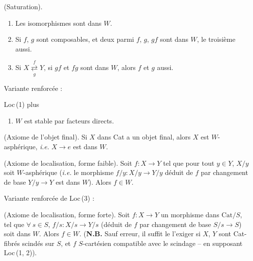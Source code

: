 \begin{description}[style=sameline,leftmargin=6.5em]
\item[Loc\,(1)] (Saturation).
\begin{enumerate}[leftmargin=2.5em]
\item[$a$)] Les isomorphismes sont dans $W$.
\item[$b$)] Si $f$, $g$ sont composables, et deux parmi $f$, $g$, $gf$ sont dans $W$, le troisième aussi.
\item[$c$)] Si $X \underset{g}{\overset{f}{\rightleftarrows}} Y$, si $gf$ et $fg$ sont dans $W$, alors $f$ et $g$ aussi.
\end{enumerate}
\end{description}
\noindent Variante renforcée :
\begin{description}[style=sameline,leftmargin=6.5em]
\item[Loc\,(1\,bis)] Loc\,(1) plus
\begin{enumerate}[leftmargin=2.5em]
\item[$d$)] $W$ est stable par facteurs directs.
\end{enumerate}
\item[Loc\,(2)] (Axiome de l'objet final). Si $X$ dans Cat a un objet final, alors $X$ est $W$-asphérique, \textit{i.e.} $X \longrightarrow e$ est dans $W$.
\item[Loc\,(3)] (Axiome de localisation, forme faible). Soit $f : X \longrightarrow Y$ tel que pour tout $y \in Y$, $X/y$ soit $W$-asphérique (\textit{i.e.} le morphisme $f/y : X/y \longrightarrow Y/y$ déduit de $f$ par changement de base $Y/y \longrightarrow Y$ est dans $W$). Alors $f \in W$.
\end{description}
\noindent Variante renforcée de Loc\,(3) :
\begin{description}[style=sameline,leftmargin=6.5em]
\item[Loc\,(3\,bis)] (Axiome de localisation, forme forte). Soit $f : X \longrightarrow Y$ un morphisme dans $\mathrm{Cat}/S$, tel que $\forall\ s \in S$, $f/s : X/s \longrightarrow Y/s$ (déduit de $f$ par changement de base $S/s \longrightarrow S$) soit dans $W$. Alors $f \in W$. (\textbf{N.B.} Sauf erreur, il suffit le l'exiger si $X$, $Y$ sont Cat-fibrés scindés sur $S$, et $f$ $S$-cartésien compatible avec le scindage – en supposant Loc\,(1, 2)). %
\end{description}


